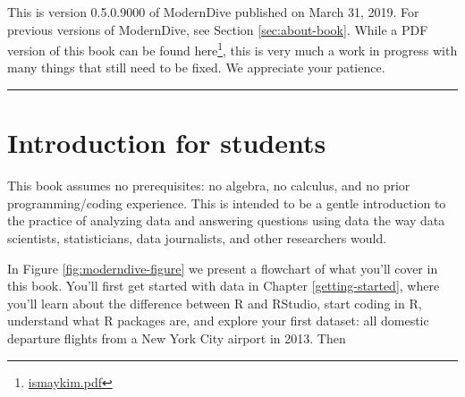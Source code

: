 \documentclass[12pt, krantz2,]{krantz}
\renewcommand{\href}[2]{#2\footnote{\url{#1}}}
\begin{document}
This is version 0.5.0.9000 of ModernDive published on March 31, 2019. For previous versions of ModernDive, see Section \ref{sec:about-book}. While a PDF version of this book can be found \href{ismaykim.pdf}{here}, this is very much a work in progress with many things that still need to be fixed. We appreciate your patience.

\begin{center}\rule{0.5\linewidth}{\linethickness}\end{center}

\hypertarget{sec:intro-for-students}{%
\section{Introduction for students}\label{sec:intro-for-students}}

This book assumes no prerequisites: no algebra, no calculus, and no prior programming/coding experience. This is intended to be a gentle introduction to the practice of analyzing data and answering questions using data the way data scientists, statisticians, data journalists, and other researchers would.

In Figure \ref{fig:moderndive-figure} we present a flowchart of what you'll cover in this book. You'll first get started with data in Chapter \ref{getting-started}, where you'll learn about the difference between R and RStudio, start coding in R, understand what R packages are, and explore your first dataset: all domestic departure flights from a New York City airport in 2013. Then
\end{document}
